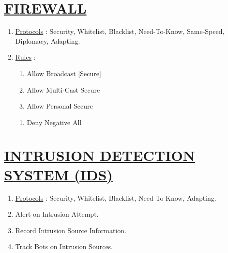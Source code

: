 \documentclass[11pt]{article}
\begin{document}
\section*{\ul{FIREWALL}}
\begin{enumerate}
	\item[] \ul{Protocols} : Security, Whitelist, Blacklist, Need-To-Know, Same-Speed, Diplomacy, Adapting.

	\item[] \ul{Rules} :
	\begin{enumerate}
		\item[] Allow Broadcast [Secure]
		\item[] Allow Multi-Cast Secure
		\item[] Allow Personal Secure
	\end{enumerate}

	\begin{enumerate}
		\item[] Deny Negative All
	\end{enumerate}
	
\end{enumerate}


\section*{\ul{INTRUSION DETECTION SYSTEM (IDS)}}
\begin{enumerate}
	\item[] \ul{Protocols} : Security, Whitelist, Blacklist, Need-To-Know, Adapting.
	\item[] Alert on Intrusion Attempt.
	\item[] Record Intrusion Source Information.
	\item[] Track Bots on Intrusion Sources.
\end{enumerate}
\end{document}
